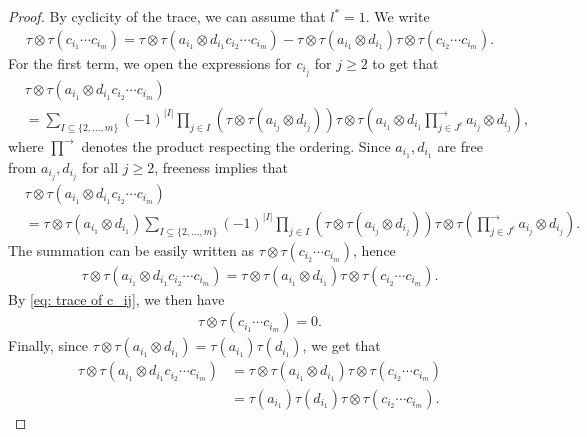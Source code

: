 \documentclass[12pt,reqno]{amsart}
\theoremstyle{plain}
\newcommand{\1}{\mathbf{1}}
\begin{document}
\begin{proof}
    By cyclicity of the trace, we can assume that $l^*=1$. We write
    \begin{align}\label{eq: trace of c_ij}
        \tau\otimes \tau(c_{i_1}\cdots c_{i_m})=\tau\otimes \tau(a_{i_1}\otimes d_{i_1}c_{i_2}\cdots c_{i_m})-\tau\otimes \tau(a_{i_1}\otimes d_{i_1})\tau\otimes \tau(c_{i_2}\cdots c_{i_m}).
    \end{align}
    For the first term, we open the expressions for $c_{i_j}$ for $j \ge 2$ to get that
    \begin{align*}
        &\tau\otimes \tau(a_{i_1}\otimes d_{i_1}c_{i_2}\cdots c_{i_m}) \\
        &=\sum_{I\subseteq \{2,\ldots,m\}}(-1)^{|I|}\prod_{j \in I}\left(\tau\otimes \tau(a_{i_j}\otimes d_{i_j}) \right)\tau\otimes \tau\left(a_{i_1}\otimes d_{i_1}\prod_{j \in J^c}^{\to}a_{i_j}\otimes d_{i_j}\right),
    \end{align*}
    where $\overset{\to}{\prod}$ denotes the product respecting the ordering. Since $a_{i_1},d_{i_1}$ are free from $a_{i_j},d_{i_j}$ for all $j \ge 2$, freeness implies that
    \begin{align*}
         &\tau\otimes \tau(a_{i_1}\otimes d_{i_1}c_{i_2}\cdots c_{i_m})\\
         &=\tau\otimes \tau(a_{i_1}\otimes d_{i_1})\sum_{I\subseteq \{2,\ldots,m\}}(-1)^{|I|}\prod_{j \in I}\left(\tau\otimes \tau(a_{i_j}\otimes d_{i_j})\right) \tau\otimes \tau\left(\prod_{j \in J^c}^{\to}a_{i_j}\otimes d_{i_j}\right).
    \end{align*}
    The summation can be easily written as $\tau\otimes \tau(c_{i_2}\cdots c_{i_m})$, hence
    \begin{align*}
        \tau\otimes \tau(a_{i_1}\otimes d_{i_1}c_{i_2}\cdots c_{i_m})=\tau\otimes \tau(a_{i_1}\otimes d_{i_1})\tau\otimes \tau(c_{i_2}\cdots c_{i_m}).
    \end{align*}
    By \eqref{eq: trace of c_ij}, we then have
    \begin{align*}
        \tau\otimes \tau(c_{i_1}\cdots c_{i_m})=0.
    \end{align*}
    Finally, since $\tau\otimes \tau(a_{i_1}\otimes d_{i_1})=\tau(a_{i_1})\tau(d_{i_1})$, we get that
    \begin{align*}
        \tau\otimes \tau(a_{i_1}\otimes d_{i_1}c_{i_2}\cdots c_{i_m})&=\tau\otimes \tau(a_{i_1}\otimes d_{i_1})\tau\otimes \tau(c_{i_2}\cdots c_{i_m})\\
        &=\tau(a_{i_1})\tau(d_{i_1})\tau\otimes \tau(c_{i_2}\cdots c_{i_m}).
    \end{align*}
\end{proof}
\end{document}
